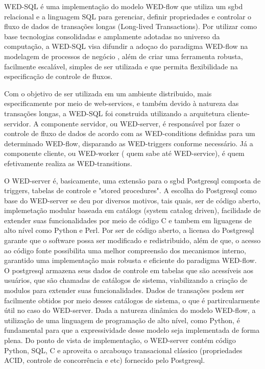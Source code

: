 


  WED-SQL é uma implementação do modelo WED-flow que utiliza um sgbd relacional e a linguagem SQL para gerenciar,
definir propriedades e controlar o fluxo de dados de transações longas (Long-lived Transactions). Por utilizar
como base tecnologias consolidadas e amplamente adotadas no universo da computação, a WED-SQL visa difundir a adoçao
do paradigma WED-flow na modelagem de processos de negócio , além de criar uma ferramenta robusta, facilmente
escalável, simples de ser utilizada e que permita flexibilidade na especificação de controle de fluxos.


  Com o objetivo de  ser utilizada em um ambiente distribuido, mais especificamente por meio de web-services, e também
devido à natureza das transações longas, a WED-SQL foi construida utilizando a arquitetura cliente-servidor. A componente
servidor, ou WED-server, é responsável por fazer o controle de fluxo de dados de acordo com as WED-conditions definidas
para um determinado WED-flow, disparando as WED-triggers conforme necessário. Já a componente cliente, ou WED-worker (
quem sabe até WED-service), é quem efetivamente realiza as WED-transitions.

  O WED-server é, basicamente, uma extensão para o sgbd Postgresql composta de triggers, tabelas de controle e "stored
procedures". A escolha do Postgresql como base do WED-server se deu por diversos motivos, tais quais, ser de código aberto, 
implemetação modular baseada em catálogs (system catalog driven), facilidade de extender suas funcionalidades por meio de
código C e tambem em liguagens de alto nível como Python e Perl. Por ser de código aberto, a licensa do Postgresql garante
que o software possa ser modificado e redistribuido, além de que, o acesso ao código fonte possibilita uma melhor compreensão
dos mecanismos interno, garantido uma implementação mais robusta e eficiente do paradigma WED-flow. O postgresql armazena seus
dados de controle em tabelas que são acessíveis aos usuários, que são chamadas de catálogos de sistema, viabilizando a 
criação de modulos para extender suas funcionalidades. Dados de transações podem ser facilmente obtidos por meio desses 
catálogos de sistema, o que é partircularmente útil no caso do WED-server. Dada a natureza dinâmica do modelo WED-flow,
a utilização de uma linguagem de programação de alto nível, como Python, é fundamental para que a expressividade desse
modelo seja implementada de forma plena. Do ponto de vista de implementação, o WED-server contém código Python, SQL, C e 
aproveita o arcabouço transacional clássico (propriedades ACID, controle de concorrência e etc) fornecido pelo Postgresql.

